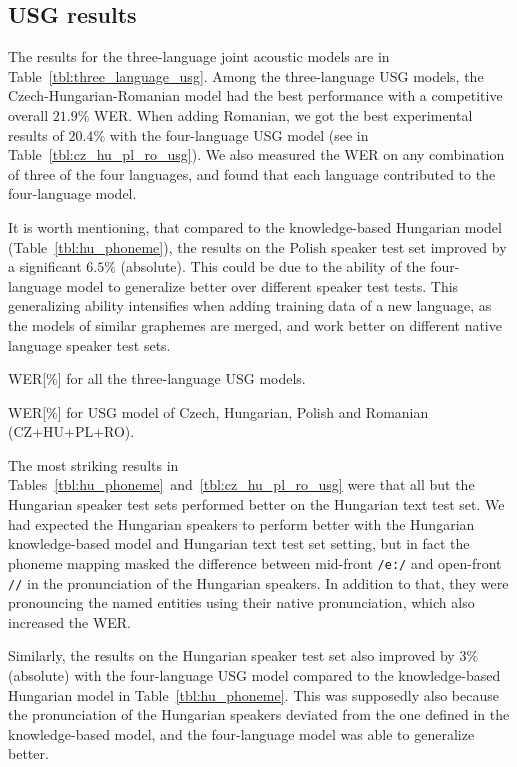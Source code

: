 \documentclass[runningheads,a4paper]{llncs}
\begin{document}
\subsection{USG results}
The results for the three-language joint acoustic models are in Table~\ref{tbl:three_language_usg}.
Among the three-language USG models, the Czech-Hungarian-Romanian model had the best performance with a competitive overall $21.9\%$ WER. 
When adding Romanian, we got the best experimental results of $20.4\%$ with the four-language USG model (see in Table~\ref{tbl:cz_hu_pl_ro_usg}).
We also measured the WER on any combination of three of the four languages, and found that each language contributed to the four-language model.

It is worth mentioning, that compared to the knowledge-based Hungarian model (Table~\ref{tbl:hu_phoneme}), the results on the Polish speaker test set improved by a significant $6.5\%$ (absolute).
This could be due to the ability of the four-language model to generalize better over different speaker test tests.
This generalizing ability intensifies when adding training data of a new language, as the models of similar graphemes are merged, and work better on different native language speaker test sets.

\begin{table}
\parbox{.45\linewidth}{
\centering
\caption{WER[\%] for all the three-language USG models.}
\label{tbl:three_language_usg}
}
\hfill
\parbox{.45\linewidth}{
\centering
\caption{WER[\%] for USG model of Czech, Hungarian, Polish and Romanian (CZ+HU+PL+RO).}
\label{tbl:cz_hu_pl_ro_usg}
}
\end{table}
The most striking results in Tables~\ref{tbl:hu_phoneme}~and~\ref{tbl:cz_hu_pl_ro_usg} were that all but the Hungarian speaker test sets performed better on the Hungarian text test set.
We had expected the Hungarian speakers to perform better with the Hungarian knowledge-based model and Hungarian text test set setting, but in fact the phoneme mapping masked the difference between mid-front \texttt{/e:/} and open-front \texttt{//} in the pronunciation of the Hungarian speakers.
In addition to that, they were pronouncing the named entities using their native pronunciation, which also increased the WER.

Similarly, the results on the Hungarian speaker test set also improved by $3\%$ (absolute) with the four-language USG model compared to the knowledge-based Hungarian model in Table~\ref{tbl:hu_phoneme}.
This was supposedly also because the pronunciation of the Hungarian speakers deviated from the one defined in the knowledge-based model, and the four-language model was able to generalize better. 
\end{document}
